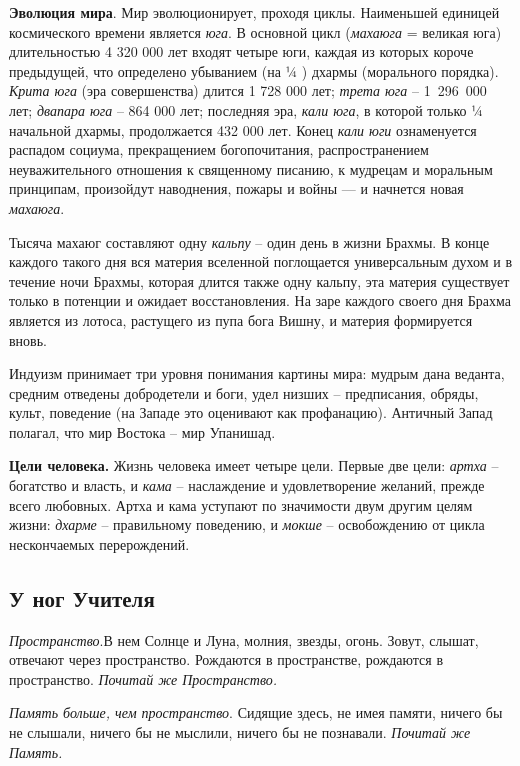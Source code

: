 \textbf{Эволюция мира}. Мир эволюционирует, проходя циклы. Наименьшей единицей космического времени является
\textit{юга}. В основной цикл (\textit{махаюга} = великая юга) длительностью 4 320 000 лет входят четыре юги, каждая из
которых короче предыдущей, что определено убыванием (на ¼ ) дхармы (морального порядка). \textit{Крита юга} (эра
совершенства) длится 1 728 000 лет; \textit{трета юга} – 1~296~000 лет; \textit{двапара юга} – 864 000 лет; последняя
эра, \textit{кали юга}, в которой только ¼ начальной дхармы, продолжается 432 000 лет. Конец \textit{кали юги}
ознаменуется распадом социума, прекращением богопочитания, распространением неуважительного отношения к священному
писанию, к мудрецам и моральным принципам, произойдут наводнения, пожары и войны — и начнется новая \textit{махаюга}.

Тысяча махаюг составляют одну \textit{кальпу} – один день в жизни Брахмы. В конце каждого такого дня вся материя
вселенной поглощается универсальным духом и в течение ночи Брахмы, которая длится также одну кальпу, эта материя
существует только в потенции и ожидает восстановления. На заре каждого своего дня Брахма является из лотоса, растущего
из пупа бога Вишну, и материя формируется вновь.

Индуизм принимает три уровня понимания картины мира: мудрым дана веданта, средним отведены добродетели и боги, удел
низших – предписания, обряды, культ, поведение (на Западе это оценивают как профанацию). Античный Запад полагал, что
мир Востока – мир Упанишад.

\textbf{Цели человека.} Жизнь человека имеет четыре цели. Первые две цели: \textit{артха} – богатство и власть, и
\textit{кама} – наслаждение и удовлетворение желаний, прежде всего любовных. Артха и кама уступают по значимости двум
другим целям жизни: \textit{дхарме} – правильному поведению, и \textit{мокше} – освобождению от цикла нескончаемых
перерождений.

\subsection[У ног Учителя]{У ног Учителя}
\textit{Пространство}.В нем Солнце и Луна, молния, звезды, огонь. Зовут, слышат, отвечают через пространство. Рождаются
в пространстве, рождаются в пространство. \textit{Почитай же Пространство.}

\textit{Память больше, чем пространство}. Сидящие здесь, не имея памяти, ничего бы не слышали, ничего бы не мыслили,
ничего бы не познавали. \textit{Почитай же Память.}

